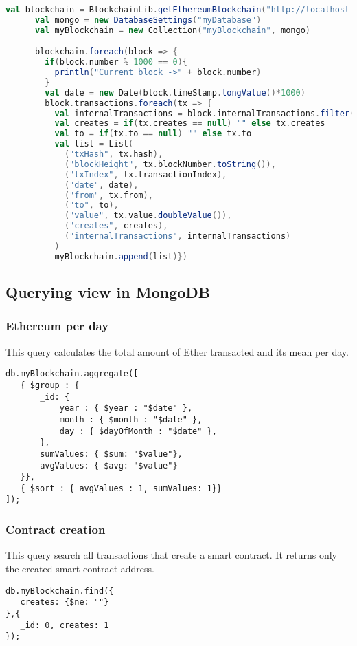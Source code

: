\begin{lstlisting}[language=Scala]
    val blockchain = BlockchainLib.getEthereumBlockchain("http://localhost:8545")
      val mongo = new DatabaseSettings("myDatabase")
      val myBlockchain = new Collection("myBlockchain", mongo)

      blockchain.foreach(block => {
        if(block.number % 1000 == 0){
          println("Current block ->" + block.number)
        }
        val date = new Date(block.timeStamp.longValue()*1000)
        block.transactions.foreach(tx => {
          val internalTransactions = block.internalTransactions.filter(itx => itx.parentTxHash.equals(tx.hash))
          val creates = if(tx.creates == null) "" else tx.creates
          val to = if(tx.to == null) "" else tx.to
          val list = List(
            ("txHash", tx.hash),
            ("blockHeight", tx.blockNumber.toString()),
            ("txIndex", tx.transactionIndex),
            ("date", date),
            ("from", tx.from),
            ("to", to),
            ("value", tx.value.doubleValue()),
            ("creates", creates),
            ("internalTransactions", internalTransactions)
          )
          myBlockchain.append(list)})
\end{lstlisting}
\subsection{Querying view in MongoDB}
\subsubsection{Ethereum per day}
This query calculates the total amount of Ether transacted and its mean per day.
\begin{center}
\begin{varwidth}{\linewidth}
\begin{verbatim}
db.myBlockchain.aggregate([
   { $group : {
       _id: {
           year : { $year : "$date" },
           month : { $month : "$date" },
           day : { $dayOfMonth : "$date" },
       },
       sumValues: { $sum: "$value"},
       avgValues: { $avg: "$value"}
   }},
   { $sort : { avgValues : 1, sumValues: 1}}
]);
\end{verbatim}
\end{varwidth}
\end{center}
\subsubsection{Contract creation}
This query search all transactions that create a smart contract. It returns only the created smart contract address. 
\begin{center}
\begin{varwidth}{\linewidth}
\begin{verbatim}
db.myBlockchain.find({
   creates: {$ne: ""}
},{
   _id: 0, creates: 1
});

\end{verbatim}
\end{varwidth}
\end{center}
